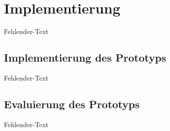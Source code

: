 \newpage
\section{Implementierung}
Fehlender-Text

\subsection{Implementierung des Prototyps}
Fehlender-Text

\newpage
\subsection{Evaluierung des Prototyps}
Fehlender-Text